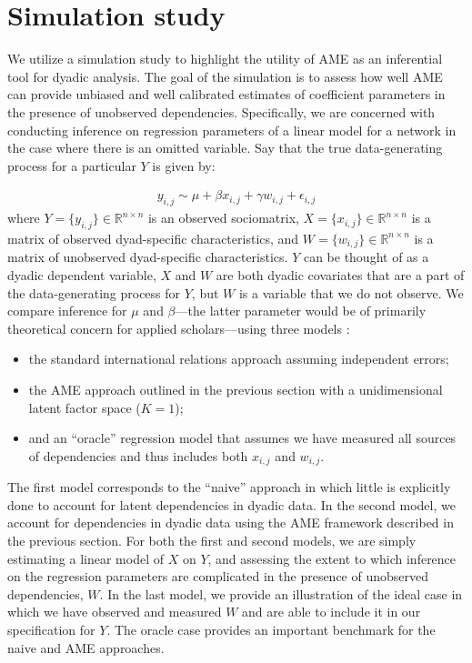 \section{\textbf{Simulation study}}

We utilize a simulation study to highlight the utility of AME as an inferential tool for dyadic analysis. The goal of the simulation is to assess how well AME can provide unbiased and well calibrated estimates of coefficient parameters in the presence of unobserved dependencies. Specifically, we are concerned with conducting inference on regression parameters of a linear model for a network in the case where there is an omitted variable. Say that the true data-generating process for a particular $Y$ is given by:

\begin{align}
	y_{i,j} \sim  \mu + \beta x_{i,j} + \gamma w_{i,j} + \epsilon_{i,j}
	\label{eqn:sim}
\end{align}
where $Y= \{y_{i,j}\}\in \mathbb R^{n\times n}$ is an observed sociomatrix, $X = \{x_{i,j} \} \in \mathbb R^{n \times n}$ is a matrix of observed dyad-specific characteristics, and $W = \{ w_{i,j}\} \in \mathbb R^{n \times n}$ is a matrix of unobserved dyad-specific characteristics. $Y$ can be thought of as a dyadic dependent variable, $X$ and $W$ are both dyadic covariates that are a part of the data-generating process for $Y$, but $W$ is a variable that we do not observe. We compare inference for $\mu$ and $\beta$---the latter parameter would be of primarily theoretical concern for applied scholars---using three models :

\begin{itemize}
	\item the standard international relations approach assuming independent errors; 
	\item the AME approach outlined in the previous section with a unidimensional latent factor space ($K=1$);
	\item and an ``oracle'' regression model that assumes we have measured all sources of dependencies and thus includes both $x_{i,j}$ and $w_{i,j}$. 
\end{itemize}

The first model corresponds to the ``naive'' approach in which little is explicitly done to account for latent dependencies in dyadic data. In the second model, we account for dependencies in dyadic data using the AME framework described in the previous section. For both the first and second models, we are simply estimating a linear model of $X$ on $Y$, and assessing the extent to which inference on the regression parameters are complicated in the presence of unobserved dependencies, $W$. In the last model, we provide an illustration of the ideal case in which we have observed and measured $W$ and are able to include it in our specification for $Y$. The oracle case provides an important benchmark for the naive and AME approaches.

